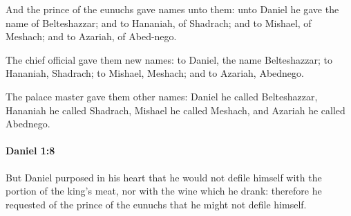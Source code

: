 			\begin{versebox}
					\item[BHS] 
					\item[LXX] 
					\item[ASV] And the prince of the eunuchs gave names unto them: unto Daniel he gave the name of Belteshazzar; and to Hananiah, of Shadrach; and to Mishael, of Meshach; and to Azariah, of Abed-nego.
					\item[NIV] The chief official gave them new names: to Daniel, the name Belteshazzar; to Hananiah, Shadrach; to Mishael, Meshach; and to Azariah, Abednego.
					\item[NRSV] The palace master gave them other names: Daniel he called Belteshazzar, Hananiah he called Shadrach, Mishael he called Meshach, and Azariah he called Abednego.
			\end{versebox}

		\paragraph{Daniel 1:8} %
			\label{DANIEL-1-8}

			But Daniel purposed in his heart that he would not defile himself with the portion of the king’s meat, nor with the wine which he drank: therefore he requested of the prince of the eunuchs that he might not defile himself.

